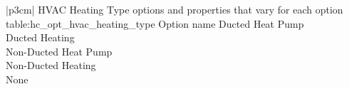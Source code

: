 \begin{customLongTable}{ |p{3cm}| }
{HVAC Heating Type options and properties that vary for each option} {table:hc_opt_hvac_heating_type}
{Option name}
Ducted Heat Pump \\ \hline
Ducted Heating \\ \hline
Non-Ducted Heat Pump \\ \hline
Non-Ducted Heating \\ \hline
None \\
\end{customLongTable}
